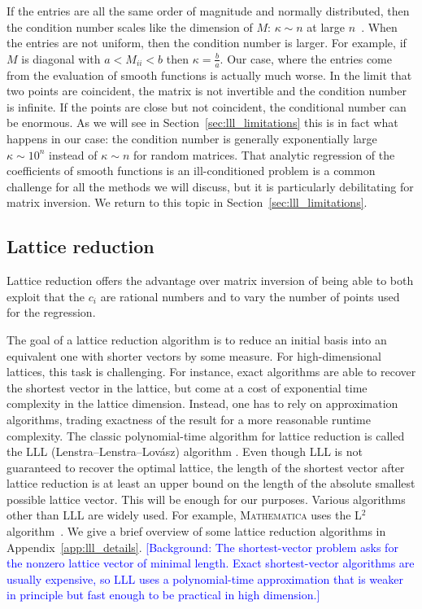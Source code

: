 \documentclass[a4paper,11pt]{article}
\begin{document}
If the entries are all the same order of magnitude and normally distributed, then the condition number scales like the dimension of $M$: $\kappa \sim n$ at large $n$~\cite{Edelman1988}. 
When the entries are not uniform, then the condition number is larger.
For example, if $M$ is diagonal with $a < M_{ii} < b$ then $\kappa = \frac{b}{a}$. Our case, where the entries come from the evaluation of smooth functions is actually much worse. In the limit that two points are coincident, the matrix is not invertible and the condition number is infinite. If the points are close but not coincident, the conditional number can be enormous. As we will see in Section~\ref{sec:lll_limitations}
this is in fact what happens in our case: the condition number is generally exponentially large $\kappa\sim 10^n$ instead of $\kappa\sim n$ for random matrices. 
That analytic regression of the coefficients of smooth functions is an ill-conditioned problem is a common challenge for  all the methods we will discuss, but it is particularly debilitating for matrix inversion. We return to this topic in Section~\ref{sec:lll_limitations}.

 


\subsection{Lattice reduction}

Lattice reduction offers the advantage over matrix inversion of being able to both exploit that the $c_i$ are rational numbers and to vary the number of points used for the regression.

The goal of a lattice reduction algorithm is to reduce an initial basis into an equivalent one with shorter vectors by some measure. For high-dimensional lattices, this task is challenging. For instance, exact algorithms are able to recover the shortest vector in the lattice, but come at a cost of exponential time complexity in the lattice dimension. Instead,  one has to rely on approximation algorithms, trading exactness of the result for a more reasonable runtime complexity. The classic polynomial-time algorithm for lattice reduction is called the LLL (Lenstra–Lenstra–Lovász) algorithm \cite{Lenstra:1982}. 
Even though LLL is not guaranteed to recover the optimal lattice, the length of the shortest vector after lattice reduction is at least an upper bound on the length of the absolute smallest possible lattice vector. This will be enough for our purposes. 
Various algorithms other than LLL are widely used. For example, \textsc{Mathematica} uses the L$^2$ algorithm~\cite{Nguyen:2001}. We give a brief overview of some lattice reduction algorithms in Appendix~\ref{app:lll_details}. 
\textcolor{blue}{\small [Background: The shortest-vector problem asks for the nonzero lattice vector of minimal length. Exact shortest-vector algorithms are usually expensive, so LLL uses a polynomial-time approximation that is weaker in principle but fast enough to be practical in high dimension.]}
\end{document}
